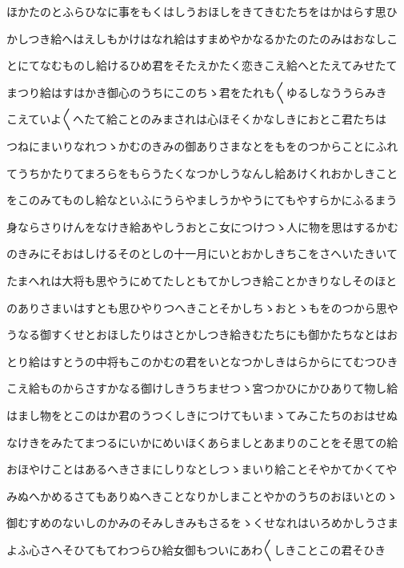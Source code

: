 \documentclass[a4paper,11pt,landscape]{ltjtarticle}
\begin{document}
\par\medskip
ほかたのとふらひなに事をもくはしうおほしをきてきむたちをはかはらす思ひ
\par\medskip
かしつき給へはえしもかけはなれ給はすまめやかなるかたのたのみはおなしこ
\par\medskip
とにてなむものし給けるひめ君をそたえかたく恋きこえ給へとたえてみせたて
\par\medskip
まつり給はすはかき御心のうちにこのちゝ君をたれも〱ゆるしなううらみき
\par\medskip
こえていよ〱へたて給ことのみまされは心ほそくかなしきにおとこ君たちは
\par\medskip
つねにまいりなれつゝかむのきみの御ありさまなとをもをのつからことにふれ
\par\medskip
てうちかたりてまろらをもらうたくなつかしうなんし給あけくれおかしきこと
\par\medskip
をこのみてものし給なといふにうらやましうかやうにてもやすらかにふるまう
\par\medskip
身ならさりけんをなけき給あやしうおとこ女につけつゝ人に物を思はするかむ
\par\medskip
のきみにそおはしけるそのとしの十一月にいとおかしきちこをさへいたきいて
\par\medskip
たまへれは大将も思やうにめてたしともてかしつき給ことかきりなしそのほと
\par\medskip
のありさまいはすとも思ひやりつへきことそかしちゝおとゝもをのつから思や
\par\medskip
うなる御すくせとおほしたりはさとかしつき給きむたちにも御かたちなとはお
\par\medskip
とり給はすとうの中将もこのかむの君をいとなつかしきはらからにてむつひき
\par\medskip
こえ給ものからさすかなる御けしきうちませつゝ宮つかひにかひありて物し給
\par\medskip
はまし物をとこのはか君のうつくしきにつけてもいまゝてみこたちのおはせぬ
\par\medskip
なけきをみたてまつるにいかにめいほくあらましとあまりのことをそ思ての給
\par\medskip
おほやけことはあるへきさまにしりなとしつゝまいり給ことそやかてかくてや
\par\medskip
みぬへかめるさてもありぬへきことなりかしまことやかのうちのおほいとのゝ
\par\medskip
御むすめのないしのかみのそみしきみもさるをゝくせなれはいろめかしうさま
\par\medskip
よふ心さへそひてもてわつらひ給女御もついにあわ〱しきことこの君そひき
\par\medskip
\end{document}
